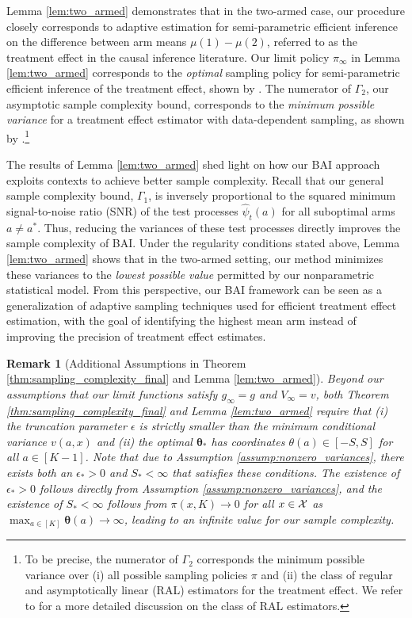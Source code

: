 \documentclass{article}
\newtheorem{remark}{Remark}
\begin{document}
Lemma \ref{lem:two_armed} demonstrates that in the two-armed case, our procedure closely corresponds to adaptive estimation for semi-parametric efficient inference on the difference between arm means $\mu(1) - \mu(2)$, referred to as the treatment effect in the causal inference literature. Our limit policy $\pi_\infty$ in Lemma \ref{lem:two_armed} corresponds to the \textit{optimal} sampling policy for semi-parametric efficient inference of the treatment effect, shown by \cite{han}. The numerator of $\Gamma_2$, our asymptotic sample complexity bound, corresponds to the \textit{minimum possible variance} for a treatment effect estimator with data-dependent sampling, as shown by \cite{cook2024semiparametricefficientinferenceadaptive}.\footnote{To be precise, the numerator of $\Gamma_2$ corresponds the minimum possible variance over (i) all possible sampling policies $\pi$ and (ii) the class of regular and asymptotically linear (RAL) estimators for the treatment effect. We refer to \cite{vanderVaart1998} for a more detailed discussion on the class of RAL estimators.}

The results of Lemma \ref{lem:two_armed} shed light on how our BAI approach exploits contexts to achieve better sample complexity. Recall that our general sample complexity bound, $\Gamma_1$, is inversely proportional to the squared minimum signal-to-noise ratio (SNR) of the test processes $\hat\psi_t(a)$ for all suboptimal arms $a \neq a^*$. Thus, reducing the variances of these test processes directly improves the sample complexity of BAI. Under the regularity conditions stated above, Lemma \ref{lem:two_armed} shows that in the two-armed setting, our method minimizes these variances to the \textit{lowest possible value} permitted by our nonparametric statistical model. From this perspective, our BAI framework can be seen as a generalization of adaptive sampling techniques used for efficient treatment effect estimation, with the goal of identifying the highest mean arm instead of improving the precision of treatment effect estimates.

\begin{remark}[Additional Assumptions in Theorem \ref{thm:sampling_complexity_final} and Lemma \ref{lem:two_armed}]
    Beyond our assumptions that our limit functions satisfy $g_\infty = g$ and $V_\infty = v$, both Theorem \ref{thm:sampling_complexity_final} and Lemma \ref{lem:two_armed} require that (i) the truncation parameter $\epsilon$ is strictly smaller than the minimum conditional variance $v(a,x)$ and (ii) the optimal $\bm{\theta}_*$ has coordinates $\theta(a) \in [-S,S]$ for all $a \in [K-1]$. Note that due to Assumption \ref{assump:nonzero_variances}, there exists both an $\epsilon_* >0$ and $S_* < \infty$ that satisfies these conditions. The existence of $\epsilon_* > 0$ follows directly from Assumption \ref{assump:nonzero_variances}, and the existence of $S_* < \infty$ follows from $\pi(x,K) \rightarrow 0$ for all $x \in \mathcal{X}$ as $\max_{a \in [K]} \bm{\theta}(a) \rightarrow \infty$, leading to an infinite value for our sample complexity. %
\end{remark}
\end{document}
